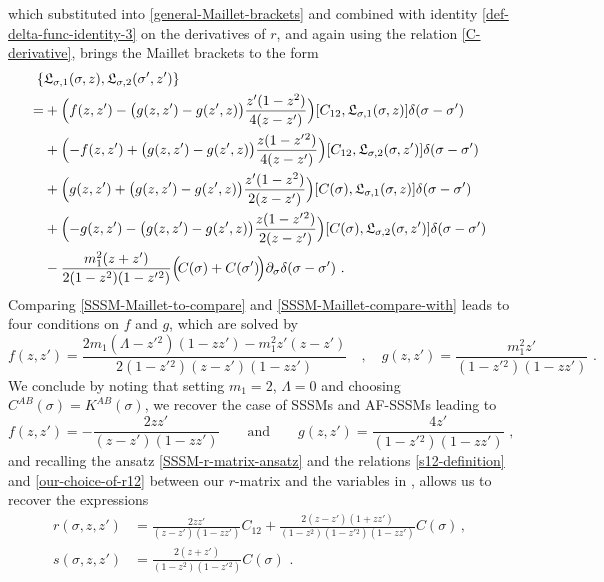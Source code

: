 \documentclass[12pt]{article}
\numberwithin{equation}{section}
\begin{document}
which substituted into \eqref{general-Maillet-brackets} and combined with identity \eqref{def-delta-func-identity-3} on the derivatives of $r$, and again using the relation \eqref{C-derivative}, brings the Maillet brackets to the form
\begin{align}\label{SSSM-Maillet-compare-with}
\{& \mathfrak{L}_{\sigma,1}(\sigma,z),\mathfrak{L}_{\sigma,2}(\sigma',z') \}
\\
=&+\Bigl(f(z,z')-\bigl(g(z,z')-g(z',z) \bigr)\frac{z'(1-z^2)}{4(z-z')}  \Bigr)[C_{12},\mathfrak{L}_{\sigma,1}(\sigma,z)]\delta(\sigma-\sigma')
\notag \\
&+\Bigl(-f(z,z')+\bigl(g(z,z')-g(z',z) \bigr)\frac{z(1-z'{}^2)}{4(z-z')}  \Bigr)[C_{12},\mathfrak{L}_{\sigma,2}(\sigma,z')]\delta(\sigma-\sigma')
\notag \\
&+\Bigl(g(z,z')+\bigl(g(z,z')-g(z',z) \bigr)\frac{z'(1-z^2)}{2(z-z')}  \Bigr)[C(\sigma),\mathfrak{L}_{\sigma,1}(\sigma,z)]\delta(\sigma-\sigma')
\notag \\
&+\Bigl(-g(z,z')-\bigl(g(z,z')-g(z',z) \bigr)\frac{z(1-z'{}^2)}{2(z-z')}  \Bigr)[C(\sigma),\mathfrak{L}_{\sigma,2}(\sigma,z')]\delta(\sigma-\sigma')
\notag \\
&-\frac{m_{1}^2(z+z')}{2(1-z^2)(1-z'{}^2)}\Bigl( \!C(\sigma)+C(\sigma')\!\Bigr)\partial_{\sigma}\delta(\sigma-\sigma') \,\, .
\notag
\end{align}
Comparing \eqref{SSSM-Maillet-to-compare} and \eqref{SSSM-Maillet-compare-with} leads to four conditions on $f$ and $g$, which are solved by
\begin{equation}
f(z,z')\!=\! \frac{2m_{1}(\Lambda\!-\!z'{}^2)(1\!-\!zz')-m_{1}^2z'(z\!-\!z')}{2(1\!-\!z'{}^2)(z\!-\!z')(1\!-\!zz')}
\quad , \quad 
g(z,z')\!=\!\frac{m_{1}^2z'}{(1\!-\!z'{}^2)(1\!-\!zz')} \,\, .
\end{equation}
We conclude by noting that setting $m_{1}=2$, $\Lambda=0$ and choosing $C^{AB}(\sigma)=K^{AB}(\sigma)$, we recover the case of SSSMs and AF-SSSMs leading to
\begin{equation}
f(z,z')=-\frac{2zz'}{(z-z')(1-zz')} 
\qquad \text{and} \qquad 
g(z,z')=\frac{4z'}{(1-z'{}^2)(1-zz')} \,\, ,
\end{equation}
and recalling the ansatz \eqref{SSSM-r-matrix-ansatz} and the relations \eqref{s12-definition} and \eqref{our-choice-of-r12} between our $r$-matrix and the variables in \cite{Forger:1991ty}, allows us to recover the expressions
\begin{equation}
\begin{aligned}
r(\sigma,z,z')&=\frac{2zz'}{(z-z')(1-zz')}C_{12}+\frac{2(z-z')(1+zz')}{(1-z^2)(1-z'{}^2)(1-zz')}C(\sigma) \, ,
\\
s(\sigma,z,z')&=\frac{2(z+z')}{(1-z^2)(1-z'{}^2)}C(\sigma) \,\, .
\end{aligned}
\end{equation}
\end{document}
